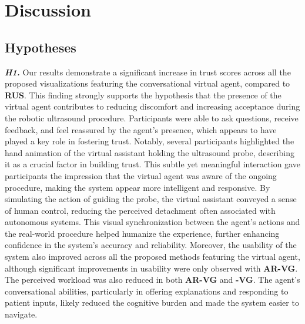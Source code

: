 \section{Discussion}\label{Sec:GeneralDiscussion}

\subsection{Hypotheses}
\textbf{\textit{H1.}} Our results demonstrate a significant increase in trust scores across all the proposed visualizations featuring the conversational virtual agent, compared to \textbf{RUS}. This finding strongly supports the hypothesis that the presence of the virtual agent contributes to reducing discomfort and increasing acceptance during the robotic ultrasound procedure. Participants were able to ask questions, receive feedback, and feel reassured by the agent’s presence, which appears to have played a key role in fostering trust. Notably, several participants highlighted the hand animation of the virtual assistant holding the ultrasound probe, describing it as a crucial factor in building trust. This subtle yet meaningful interaction gave participants the impression that the virtual agent was aware of the ongoing procedure, making the system appear more intelligent and responsive. By simulating the action of guiding the probe, the virtual assistant conveyed a sense of human control, reducing the perceived detachment often associated with autonomous systems. This visual synchronization between the agent’s actions and the real-world procedure helped humanize the experience, further enhancing confidence in the system’s accuracy and reliability.
Moreover, the usability of the system also improved across all the proposed methods featuring the virtual agent, although significant improvements in usability were only observed with \textbf{AR-VG}. The perceived workload was also reduced in both \textbf{AR-VG} and \textbf{-VG}. The agent’s conversational abilities, particularly in offering explanations and responding to patient inputs, likely reduced the cognitive burden and made the system easier to navigate.

